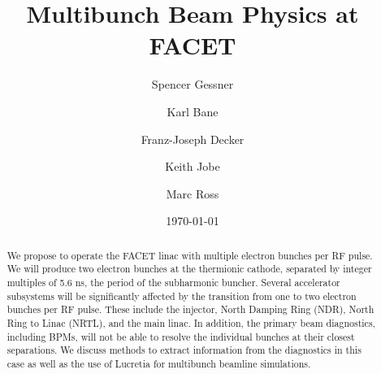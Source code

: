\documentclass[aps,prl,preprint,groupedaddress]{revtex4-1}
\begin{document}

\title{Multibunch Beam Physics at FACET}


\author{Spencer Gessner}

\author{Karl Bane}
\author{Franz-Joseph Decker}
\author{Keith Jobe}
\author{Marc Ross}


\date{\today}

\begin{abstract}
We propose to operate the FACET linac with multiple electron bunches per RF pulse. We will produce two electron bunches at the thermionic cathode, separated by integer multiples of 5.6 ns, the period of the subharmonic buncher. Several accelerator subsystems will be significantly affected by the transition from one to two electron bunches per RF pulse. These include the injector, North Damping Ring (NDR), North Ring to Linac (NRTL), and the main linac. In addition, the primary beam diagnostics, including BPMs, will not be able to resolve the individual bunches at their closest separations. We discuss methods to extract information from the diagnostics in this case as well as the use of Lucretia for multibunch beamline simulations.
\end{abstract}

\pacs{}

\maketitle
\end{document}
